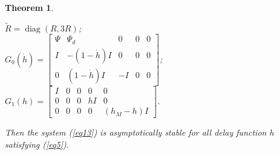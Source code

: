 \documentclass[a4paper]{cas-sc}
\newtheorem{theorem}{Theorem}
\begin{document}
\begin{theorem}
\begin{itemize}
      $ \tilde R = \operatorname{diag} (R,3R) $;\\
      $ {G_0}(\dot h) = \left[ {\begin{array}{*{20}{c}}
                \Psi & {{\Psi _d}}        & 0      & 0 & 0 \\
                I    & { - (1 - \dot h)I} & 0      & 0 & 0 \\
                0    & {(1 - \dot h)I}    & { - I} & 0 & 0
              \end{array}} \right] $;\\
      $ {G_1}(h) = \left[ {\begin{array}{*{20}{c}}
                I & 0 & 0 & 0    & 0                             \\
                0 & 0 & 0 & {hI} & 0                             \\
                0 & 0 & 0 & 0    & {\left( {{h_M} - h} \right)I}
              \end{array}} \right] $.\\
  \end{itemize}
  Then the system (\ref{eq13}) is asymptotically stable for all delay function $h$ satisfying (\ref{eq5}).

\end{theorem}
\end{document}
